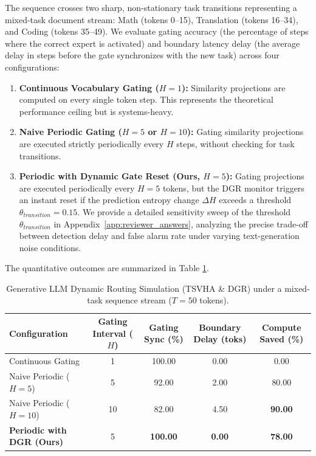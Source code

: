 The sequence crosses two sharp, non-stationary task transitions representing a mixed-task document stream: Math (tokens 0--15), Translation (tokens 16--34), and Coding (tokens 35--49). We evaluate gating accuracy (the percentage of steps where the correct expert is activated) and boundary latency delay (the average delay in steps before the gate synchronizes with the new task) across four configurations:
\begin{enumerate}
  \item \textbf{Continuous Vocabulary Gating ($H=1$):} Similarity projections are computed on every single token step. This represents the theoretical performance ceiling but is systems-heavy.
  \item \textbf{Naive Periodic Gating ($H=5$ or $H=10$):} Gating similarity projections are executed strictly periodically every $H$ steps, without checking for task transitions.
  \item \textbf{Periodic with Dynamic Gate Reset (Ours, $H=5$):} Gating projections are executed periodically every $H=5$ tokens, but the DGR monitor triggers an instant reset if the prediction entropy change $\Delta H$ exceeds a threshold $\theta_{transition} = 0.15$. We provide a detailed sensitivity sweep of the threshold $\theta_{transition}$ in Appendix~\ref{app:reviewer_answers}, analyzing the precise trade-off between detection delay and false alarm rate under varying text-generation noise conditions.
\end{enumerate}

The quantitative outcomes are summarized in Table \ref{tab:llm_dynamic_routing}.
\begin{table}[t]
  \caption{Generative LLM Dynamic Routing Simulation (TSVHA \& DGR) under a mixed-task sequence stream ($T = 50$ tokens).}
  \label{tab:llm_dynamic_routing}
  \vskip 0.15in
  \begin{center}
  \begin{small}
  \begin{sc}
  \setlength{\tabcolsep}{4.5pt}
  \begin{tabular}{lcccc}
    \toprule
    Configuration & Gating Interval ($H$) & Gating Sync (\%) & Boundary Delay (toks) & Compute Saved (\%) \\
    \midrule
    Continuous Gating & 1 & 100.00 & 0.00 & 0.00 \\
    Naive Periodic ($H=5$) & 5 & 92.00 & 2.00 & 80.00 \\
    Naive Periodic ($H=10$) & 10 & 82.00 & 4.50 & \textbf{90.00} \\
    \midrule
    \textbf{Periodic with DGR (Ours)} & 5 & \textbf{100.00} & \textbf{0.00} & \textbf{78.00} \\
    \bottomrule
  \end{tabular}
  \end{sc}
  \end{small}
  \end{center}
\end{table}

